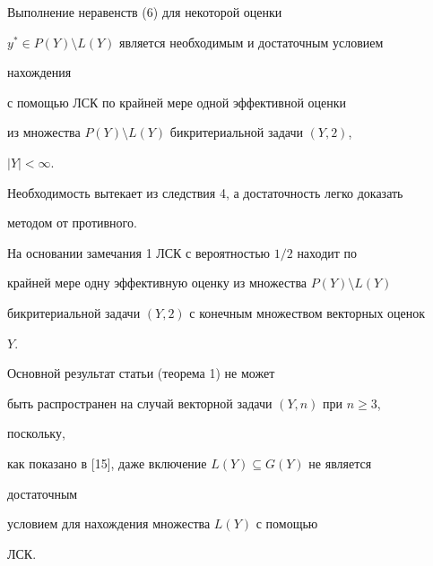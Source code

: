  


\begin{note} Выполнение неравенств (6) для некоторой оценки 


$y^*\in P(Y)\setminus L(Y)$ является необходимым и достаточным условием 


нахождения 


с помощью ЛСК по крайней мере одной эффективной оценки 


из множества $P(Y)\setminus L(Y)$ бикритериальной задачи $(Y,2)$, 


$|Y|<\infty$. 


Необходимость вытекает из следствия 4, а достаточность легко доказать 


методом от противного. 


\end{note} 


 


На основании замечания 1 ЛСК с вероятностью $1/2$ находит по 


крайней мере одну эффективную оценку из множества $P(Y)\setminus L(Y)$ 


бикритериальной задачи $(Y,2)$ с конечным множеством векторных оценок 


$Y$. 


 


\begin{note} Основной результат статьи (теорема 1) не может 


быть распространен на случай векторной задачи $(Y,n)$ при $n\ge 3$, 


поскольку, 


как показано в [15], даже включение $L(Y)\subseteq G(Y)$ не является 


достаточным 


условием для нахождения множества $L(Y)$ с помощью 


ЛСК. 


\end{note}


 


